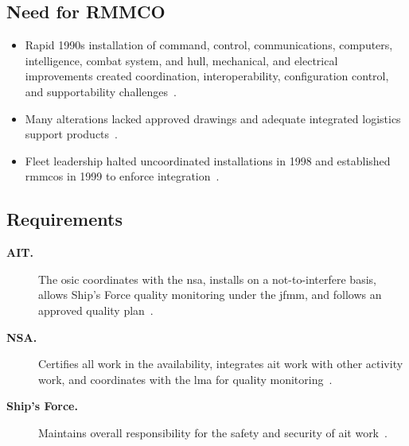 \documentclass[../main.tex]{subfiles}
\begin{document}
\subsection{Need for RMMCO}
\begin{itemize}
  \item Rapid 1990s installation of command, control, communications, computers, intelligence, combat system, and hull, mechanical, and electrical improvements created coordination, interoperability, configuration control, and supportability challenges~\autocite{edo-4-1-4-ait-fundamentals-2025}.
  \item Many alterations lacked approved drawings and adequate integrated logistics support products~\autocite{edo-4-1-4-ait-fundamentals-2025}.
  \item Fleet leadership halted uncoordinated installations in 1998 and established \acp{rmmco} in 1999 to enforce integration~\autocite{edo-4-1-4-ait-fundamentals-2025}.
\end{itemize}

\subsection{Requirements}
\begin{description}
  \item[\textbf{AIT.}] The \ac{osic} coordinates with the \ac{nsa}, installs on a not-to-interfere basis, allows Ship's Force quality monitoring under the \ac{jfmm}, and follows an approved quality plan~\autocite{edo-4-1-4-ait-fundamentals-2025}.
  \item[\textbf{NSA.}] Certifies all work in the availability, integrates \ac{ait} work with other activity work, and coordinates with the \ac{lma} for quality monitoring~\autocite{edo-4-1-4-ait-fundamentals-2025}.
  \item[\textbf{Ship's Force.}] Maintains overall responsibility for the safety and security of \ac{ait} work~\autocite{edo-4-1-4-ait-fundamentals-2025}.
\end{description}
\end{document}
